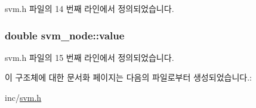 svm.\+h 파일의 14 번째 라인에서 정의되었습니다.

\hypertarget{structsvm__node_a9ca47b8a156238d04213453f3b89e177}{
\subsubsection[{value}]{\setlength{\rightskip}{0pt plus 5cm}double svm\+\_\+node\+::value}}\label{structsvm__node_a9ca47b8a156238d04213453f3b89e177}


svm.\+h 파일의 15 번째 라인에서 정의되었습니다.



이 구조체에 대한 문서화 페이지는 다음의 파일로부터 생성되었습니다.\+:\begin{DoxyCompactItemize}
\item 
inc/\hyperlink{svm_8h}{svm.\+h}\end{DoxyCompactItemize}

